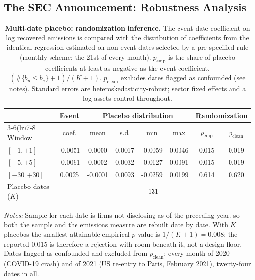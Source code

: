 \documentclass[a4paper,12pt]{article}
\begin{document}
\clearpage

\subsection{The SEC Announcement: Robustness Analysis}

\begin{table}[htbp]
\footnotesize\centering
\caption{\textbf{Multi-date placebo: randomization inference.}
The event-date coefficient on log recovered emissions is compared with the
distribution of coefficients from the identical regression estimated on
non-event dates selected by a pre-specified rule (monthly scheme: the 21st of every month).
$p_{\text{emp}}$ is the share of placebo coefficients at least as negative as
the event coefficient, $(\#\{b_{p} \le b_{e}\}+1)/(K+1)$.
$p_{\text{clean}}$ excludes dates flagged as confounded (see notes).
Standard errors are heteroskedasticity-robust; sector fixed effects and a
log-assets control throughout.}
\label{tab:returns_event_placebo_dist}
\begin{tabular}{lccccccc}
\toprule
 & Event & \multicolumn{4}{c}{Placebo distribution} & \multicolumn{2}{c}{Randomization} \\
\cmidrule(lr){3-6}\cmidrule(lr){7-8}
Window & coef. & mean & s.d. & min & max & $p_{\text{emp}}$ & $p_{\text{clean}}$ \\
\midrule
$[-1,+1]$ & -0.0051 & 0.0000 & 0.0017 & -0.0059 & 0.0046 & 0.015 & 0.019 \\
$[-5,+5]$ & -0.0091 & 0.0002 & 0.0032 & -0.0127 & 0.0091 & 0.015 & 0.019 \\
$[-30,+30]$ & 0.0025 & -0.0001 & 0.0093 & -0.0259 & 0.0199 & 0.614 & 0.620 \\
\midrule
Placebo dates ($K$) & \multicolumn{7}{c}{131} \\
\bottomrule
\end{tabular}
\begin{flushleft}\footnotesize
\textit{Notes:} Sample for each date is firms not disclosing as of the
preceding year, so both the sample and the emissions measure are rebuilt
date by date. With $K$ placebos the smallest attainable empirical $p$-value is $1/(K+1) = 0.008$;
the reported $0.015$ is therefore a rejection with room beneath it, not a design floor. Dates
flagged as confounded and excluded from $p_{\text{clean}}$: every month of 2020 (COVID-19 crash) and of 2021 (US re-entry to Paris, February 2021), twenty-four dates in all.
\end{flushleft}
\end{table}
\end{document}
